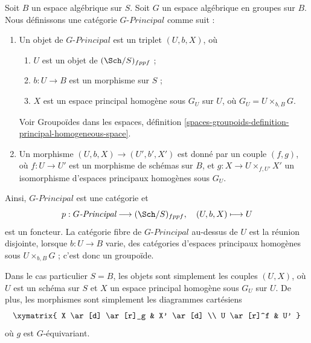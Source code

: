 \noindent
Soit $B$ un espace algébrique sur $S$.
Soit $G$ un espace algébrique en groupes sur $B$.
Nous définissons une catégorie $G\textit{-Principal}$ comme suit :
\begin{enumerate}
\item Un objet de $G\textit{-Principal}$ est un triplet $(U, b, X)$, où
\begin{enumerate}
\item $U$ est un objet de $(\Sch/S)_{fppf}$ ;
\item $b : U \to B$ est un morphisme sur $S$ ;
\item $X$ est un espace principal homogène sous $G_U$ sur $U$, où
$G_U = U \times_{b, B} G$.
\end{enumerate}
Voir
Groupoïdes dans les espaces,
définition \ref{spaces-groupoids-definition-principal-homogeneous-space}.
\item Un morphisme $(U, b, X) \to (U', b', X')$ est donné
par un couple $(f, g)$, où $f : U \to U'$ est un morphisme de schémas
sur $B$, et $g : X \to U \times_{f, U'} X'$ un
isomorphisme d'espaces principaux homogènes sous $G_U$.
\end{enumerate}
Ainsi, $G\textit{-Principal}$ est une catégorie et
$$
p : G\textit{-Principal} \longrightarrow (\Sch/S)_{fppf},
\quad
(U, b, X) \longmapsto U
$$
est un foncteur. La catégorie fibre de $G\textit{-Principal}$
au-dessus de $U$ est la réunion disjointe, lorsque $b : U \to B$ varie,
des catégories d'espaces principaux homogènes sous $U \times_{b, B} G$ ;
c'est donc un groupoïde.

\medskip\noindent
Dans le cas particulier $S = B$, les objets sont simplement les couples
$(U, X)$, où $U$ est un schéma sur $S$ et $X$ un espace principal homogène
sous $G_U$ sur $U$. De plus, les morphismes sont simplement les diagrammes
cartésiens
$$
\xymatrix{
X \ar[d] \ar[r]_g & X' \ar[d] \\
U \ar[r]^f & U'
}
$$
où $g$ est $G$-équivariant.

